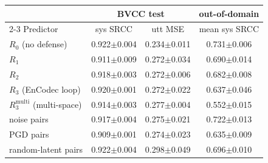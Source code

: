 \begin{tabular}{l c c c}
\toprule
& \multicolumn{2}{c}{BVCC test} & out-of-domain \\
\cmidrule(lr){2-3}
Predictor & sys SRCC & utt MSE & mean sys SRCC \\
\midrule
$R_0$ (no defense) & 0.922$\pm$0.004 & 0.234$\pm$0.011 & 0.731$\pm$0.006 \\
$R_1$ & 0.911$\pm$0.009 & 0.272$\pm$0.034 & 0.690$\pm$0.014 \\
$R_2$ & 0.918$\pm$0.003 & 0.272$\pm$0.006 & 0.682$\pm$0.008 \\
$R_3$ (EnCodec loop) & 0.920$\pm$0.001 & 0.272$\pm$0.022 & 0.637$\pm$0.046 \\
$R_3^{\mathrm{multi}}$ (multi-space) & 0.914$\pm$0.003 & 0.277$\pm$0.004 & 0.552$\pm$0.015 \\
noise pairs & 0.917$\pm$0.004 & 0.275$\pm$0.021 & 0.722$\pm$0.013 \\
PGD pairs & 0.909$\pm$0.001 & 0.274$\pm$0.023 & 0.635$\pm$0.009 \\
random-latent pairs & 0.922$\pm$0.004 & 0.298$\pm$0.049 & 0.696$\pm$0.010 \\
\bottomrule
\end{tabular}
